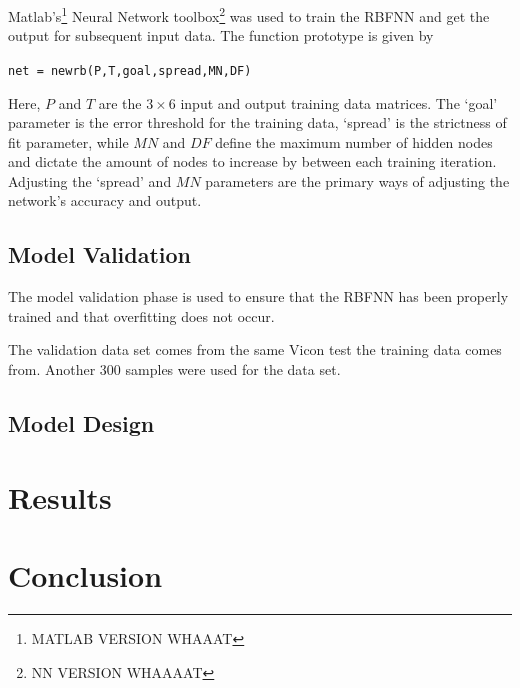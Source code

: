 Matlab's\footnote{MATLAB VERSION WHAAAT} Neural Network toolbox\footnote{NN VERSION WHAAAAT} was used to train the RBFNN and get the output for subsequent input data. The function prototype is given by 

\begin{center}
  \verb|net = newrb(P,T,goal,spread,MN,DF)|
\end{center}

Here, $P$ and $T$ are the $3\times6$ input and output training data matrices. The `goal' parameter is the error threshold for the training data, `spread' is the strictness of fit parameter, while $MN$ and $DF$ define the maximum number of hidden nodes and dictate the amount of nodes to increase by between each training iteration. Adjusting the `spread' and $MN$ parameters are the primary ways of adjusting the network's accuracy and output. 

\subsection{Model Validation}

The model validation phase is used to ensure that the RBFNN has been properly trained and that overfitting does not occur. 

The validation data set comes from the same Vicon test the training data comes from. Another 300 samples were used for the data set. 

\subsection{Model Design}

\section{Results}

\section{Conclusion}



